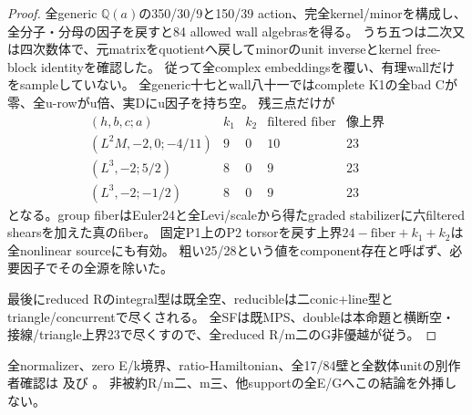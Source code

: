 \documentclass[a4paper,11pt]{ltjsarticle}
\theoremstyle{definition}
\begin{document}
\begin{proof}
全generic $\mathbb Q(a)$の350/30/9と150/39 action、完全kernel/minorを構成し、
全分子・分母の因子を戻すと84 allowed wall algebrasを得る。
うち五つは二次又は四次数体で、元matrixをquotientへ戻してminorのunit inverseとkernel free-block identityを確認した。
従って全complex embeddingsを覆い、有理wallだけをsampleしていない。
全generic十七とwall八十一ではcomplete K1の全bad Cが零、全u-rowがu倍、実Dにu因子を持ち空。
残三点だけが
\[
\begin{array}{c|c|c|c|c}
 (h,b,c;a)&k_1&k_2&\text{filtered fiber}&\text{像上界}\\\hline
 (L^2M,-2,0;-4/11)&9&0&10&23\\
 (L^3,-2;5/2)&8&0&9&23\\
 (L^3,-2;-1/2)&8&0&9&23
\end{array}
\]
となる。group fiberはEuler24と全Levi/scaleから得たgraded stabilizerに六filtered shearsを加えた真のfiber。
固定P1上のP2 torsorを戻す上界$24-\text{fiber}+k_1+k_2$は全nonlinear sourceにも有効。
粗い25/28という値をcomponent存在と呼ばず、必要因子でその全源を除いた。

最後にreduced Rのintegral型は既全空、reducibleは二conic+line型とtriangle/concurrentで尽くされる。
全SFは既MPS、doubleは本命題と横断空・接線/triangle上界23で尽くすので、全reduced R/m二のG非優越が従う。
\end{proof}
全normalizer、zero E/k境界、ratio-Hamiltonian、全17/84壁と全数体unitの別作者確認は
及び
。
非被約R/m二、m三、他supportの全E/Gへこの結論を外挿しない。
\end{document}
